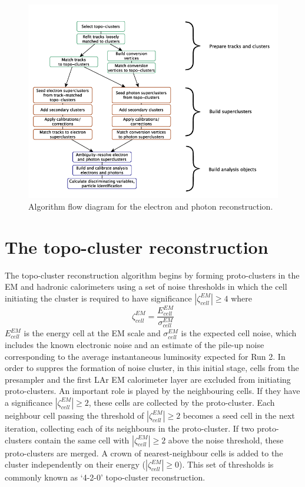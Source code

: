 \documentclass[a4paper, oneside]{book}
\begin{document}
		\begin{figure}
			\centering
			\includegraphics[width=.9\linewidth]{tesi_images/alg_flow.png} 
			\caption{Algorithm flow diagram for the electron and photon reconstruction.} 
			\label{fig:alg_flow}
		\end{figure}
		
		\section{The topo-cluster reconstruction}\label{section:Topo}
			The topo-cluster reconstruction algorithm begins by forming proto-clusters in the EM and hadronic calorimeters using a set of noise thresholds in which the cell initiating the cluster is required to have significance $|\zeta_{cell}^{EM}| \geq 4$ where 
			$$
			\zeta_{cell}^{EM} = \frac{E_{cell}^{EM}}{\sigma_{cell}^{EM}}
			$$		
			$E_{cell}^{EM}$ is the energy cell at the EM scale and $\sigma_{cell}^{EM}$ is the expected cell noise, which includes the known electronic noise and an estimate of the pile-up noise corresponding
			to the average instantaneous luminosity expected for Run 2. In order to suppres the formation of noise cluster, in this initial stage, cells from the presampler and the first LAr EM calorimeter layer are excluded from initiating proto-clusters.
			An important role is played by the neighbouring cells. If they have a significance $|\zeta_{cell}^{EM}| \geq 2$, these cells are collected by the proto-cluster. Each neighbour cell passing the threshold of $|\zeta_{cell}^{EM}| \geq 2$ becomes a seed cell in the next iteration, collecting each of its neighbours in the proto-cluster. If two proto-clusters contain the same cell with $|\zeta_{cell}^{EM}| \geq 2$ above the noise threshold, these proto-clusters are merged. A crown of nearest-neighbour cells is added to the cluster independently on their energy ($|\zeta_{cell}^{EM}| \geq 0$). This set of thresholds is commonly known as ‘4-2-0’ topo-cluster reconstruction.
			
\end{document}
